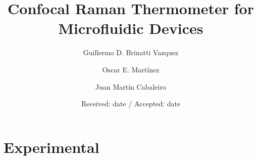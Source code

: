 \documentclass[twocolumn]{svjour3}       %
\begin{document}
\title{Confocal Raman Thermometer for Microfluidic Devices}



\author{Guillermo D. Brinatti Vazquez         \and
        Oscar E. Mart\'{i}nez \and
        Juan Mart\'{i}n Cabaleiro %
}



\date{Received: date / Accepted: date}


\maketitle

\begin{abstract}
\end{abstract}


\section{Experimental}
\end{document}
